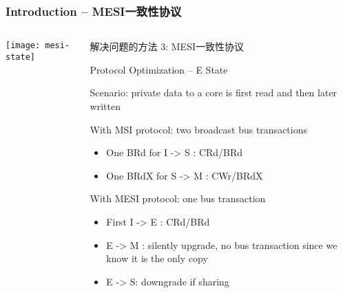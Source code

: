 \begin{frame}[plain]	
	\frametitle{Introduction -- MESI一致性协议}
	
	
	\begin{columns}
		
		\begin{column}{.4\textwidth}
			\texttt{[image: mesi-state]}
		\end{column}
		\begin{column}{.6\textwidth}
			解决问题的方法 3: MESI一致性协议
			
			Protocol Optimization – E State
			
			Scenario: private data to a core is first read and then later written
			
			With MSI protocol: two broadcast bus transactions
			\begin{itemize}				
				\item One BRd for I -> S :  CRd/BRd
				\item  One BRdX for S -> M : CWr/BRdX
			\end{itemize}
		
			With MESI protocol: one bus transaction
			\begin{itemize}	
				\item First I -> E  : CRd/BRd
				\item E -> M  : silently upgrade, no bus transaction since we know it is the only copy
				\item E -> S: downgrade if sharing				
			\end{itemize}		
			
		\end{column}
	\end{columns}
	
\end{frame}

